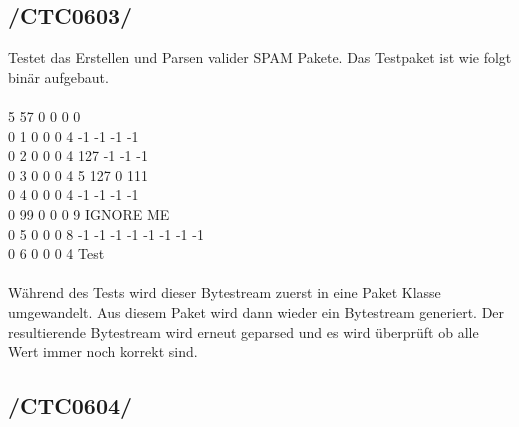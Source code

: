 \newpage

\subsection{/CTC0603/} 
Testet das Erstellen und Parsen valider SPAM Pakete. Das Testpaket ist wie folgt binär aufgebaut.
\\\\
5 57  0 0 0 0                       \\         
0 1   0 0 0 4     -1  -1  -1  -1       \\
0 2   0 0 0 4    127  -1  -1  -1           \\
0 3   0 0 0 4      5 127   0 111           \\
0 4   0 0 0 4     -1  -1  -1  -1           \\
0 99  0 0 0 9    IGNORE ME    \\
0 5   0 0 0 8     -1  -1  -1  -1  -1  -1  -1  -1    \\
0 6   0 0 0 4    Test     \\\\
Während des Tests wird dieser Bytestream zuerst in eine Paket Klasse umgewandelt.
Aus diesem Paket wird dann wieder ein Bytestream generiert. Der resultierende Bytestream
wird erneut geparsed und es wird überprüft ob alle Wert immer noch korrekt sind.

\subsection{/CTC0604/} 

